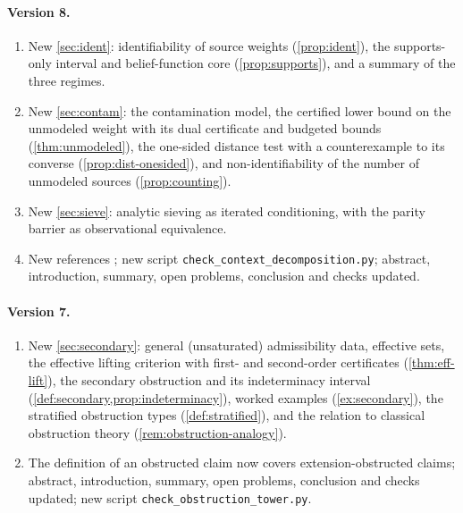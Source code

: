\documentclass[11pt]{article}
\theoremstyle{definition}
\theoremstyle{remark}
\begin{document}
\paragraph{Version 8.}
\begin{enumerate}[leftmargin=*,label=(\alph*)]
\item New \cref{sec:ident}: identifiability of source weights (\cref{prop:ident}), the supports-only
  interval and belief-function core (\cref{prop:supports}), and a summary of the three regimes.
\item New \cref{sec:contam}: the contamination model, the certified lower bound on the unmodeled
  weight with its dual certificate and budgeted bounds (\cref{thm:unmodeled}), the one-sided distance
  test with a counterexample to its converse (\cref{prop:dist-onesided}), and non-identifiability of
  the number of unmodeled sources (\cref{prop:counting}).
\item New \cref{sec:sieve}: analytic sieving as iterated conditioning, with the parity barrier as
  observational equivalence.
\item New references \cite{Chen1973,Csiszar1975,Dempster1967,FriedlanderIwaniec1998,
  FriedlanderIwaniec2010,Gale1957,Huber1964,Shafer1976,Tenenbaum2015}; new script
  \texttt{check\_context\allowbreak\_decomposition.py}; abstract, introduction, summary, open
  problems, conclusion and checks updated.
\end{enumerate}

\paragraph{Version 7.}
\begin{enumerate}[leftmargin=*,label=(\alph*)]
\item New \cref{sec:secondary}: general (unsaturated) admissibility data, effective sets, the effective
  lifting criterion with first- and second-order certificates (\cref{thm:eff-lift}), the secondary
  obstruction and its indeterminacy interval (\cref{def:secondary,prop:indeterminacy}), worked examples
  (\cref{ex:secondary}), the stratified obstruction types (\cref{def:stratified}), and the relation to
  classical obstruction theory (\cref{rem:obstruction-analogy}).
\item The definition of an obstructed claim now covers extension-obstructed claims; abstract,
  introduction, summary, open problems, conclusion and checks updated; new script
  \texttt{check\_obstruction\allowbreak\_tower.py}.
\end{enumerate}
\end{document}
